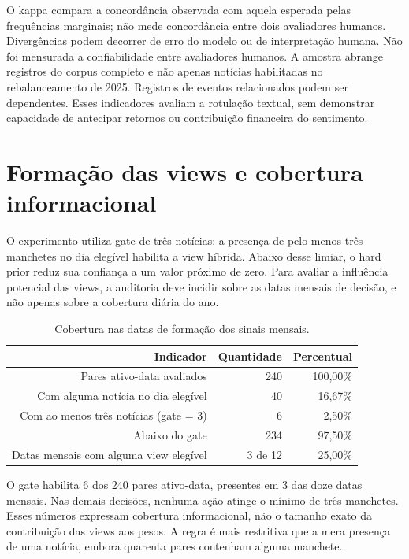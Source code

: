 O kappa compara a concordância observada com aquela esperada pelas frequências marginais; não mede concordância entre dois avaliadores humanos. Divergências podem decorrer de erro do modelo ou de interpretação humana. Não foi mensurada a confiabilidade entre avaliadores humanos. A amostra abrange registros do corpus completo e não apenas notícias habilitadas no rebalanceamento de 2025. Registros de eventos relacionados podem ser dependentes. Esses indicadores avaliam a rotulação textual, sem demonstrar capacidade de antecipar retornos ou contribuição financeira do sentimento.
\section{Formação das views e cobertura informacional}
O experimento utiliza gate de três notícias: a presença de pelo menos três manchetes no dia elegível habilita a view híbrida. Abaixo desse limiar, o hard prior reduz sua confiança a um valor próximo de zero. Para avaliar a influência potencial das views, a auditoria deve incidir sobre as datas mensais de decisão, e não apenas sobre a cobertura diária do ano.

\begin{table}[H]
\centering
\caption{Cobertura nas datas de formação dos sinais mensais.}
{\footnotesize
\begin{tabular}{@{}rrr@{}}
\hline
Indicador & Quantidade & Percentual \\ \hline
Pares ativo-data avaliados & 240 & 100,00\% \\
Com alguma notícia no dia elegível & 40 & 16,67\% \\
Com ao menos três notícias (gate = 3) & 6 & 2,50\% \\
Abaixo do gate & 234 & 97,50\% \\
Datas mensais com alguma view elegível & 3 de 12 & 25,00\% \\
\hline
\end{tabular}}
\par{}
\end{table}
O gate habilita 6 dos 240 pares ativo-data, presentes em 3 das doze datas mensais. Nas demais decisões, nenhuma ação atinge o mínimo de três manchetes. Esses números expressam cobertura informacional, não o tamanho exato da contribuição das views aos pesos. A regra é mais restritiva que a mera presença de uma notícia, embora quarenta pares contenham alguma manchete.

